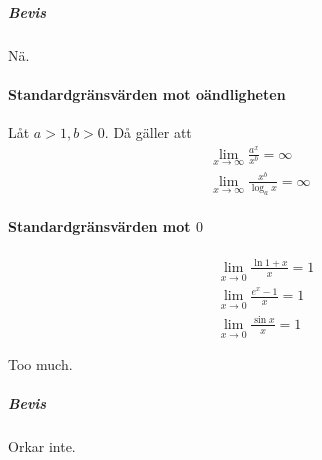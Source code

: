 \subparagraph{Bevis}
Nä.

\paragraph{Standardgränsvärden mot oändligheten}
Låt $a > 1, b > 0$. Då gäller att
\begin{align*}
	\lim\limits_{x\to\infty}\frac{a^x}{x^b} = \infty \\
	\lim\limits_{x\to\infty}\frac{x^b}{\log_a x} = \infty
\end{align*}

\proof

\paragraph{Standardgränsvärden mot $0$}
\begin{align*}
	&\lim\limits_{x\to 0}\frac{\ln{1 + x}}{x} = 1 \\
	&\lim\limits_{x\to 0}\frac{e^x - 1}{x} = 1 \\
	&\lim\limits_{x\to 0}\frac{\sin{x}}{x} = 1
\end{align*}

\proof
Too much.

\subparagraph{Bevis}
Orkar inte.